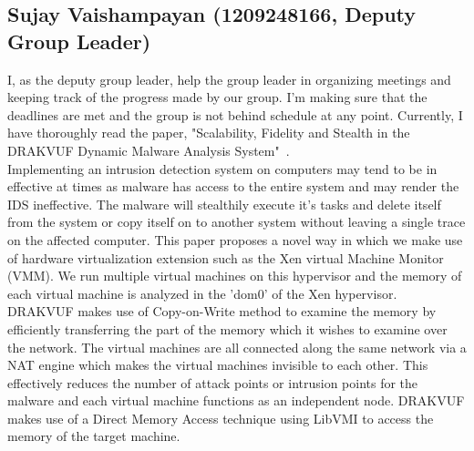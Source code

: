 \documentclass[16pt]{article}
\begin{document}
		\subsection{Sujay Vaishampayan (1209248166, Deputy Group Leader)}
		I, as the deputy group leader, help the group leader in organizing meetings and keeping track of the progress made by our group. I'm making sure that the deadlines are met and the group is not behind schedule at any point. Currently, I have thoroughly read the paper, "Scalability, Fidelity and Stealth in the DRAKVUF Dynamic Malware Analysis System"~\cite{lengyel2014scalability}. \\
		Implementing an intrusion detection system on computers may tend to be in effective at times as malware has access to the entire system and may render the IDS ineffective. The malware will stealthily execute it's tasks and delete itself from the system or copy itself on to another system without leaving a single trace on the affected computer. This paper proposes a novel way in which we make use of hardware virtualization extension such as the Xen virtual Machine Monitor (VMM). We run multiple virtual machines on this hypervisor and the memory of each virtual machine is analyzed in the 'dom0' of the Xen hypervisor. DRAKVUF makes use of Copy-on-Write method to examine the memory by efficiently transferring the part of the memory which it wishes to examine over the network. The virtual machines are all connected along the same network via a NAT engine which makes the virtual machines invisible to each other. This effectively reduces the number of attack points or intrusion points for the malware and each virtual machine functions as an independent node. DRAKVUF makes use of a Direct Memory Access technique using LibVMI to access the memory of the target machine.\\
\end{document}
